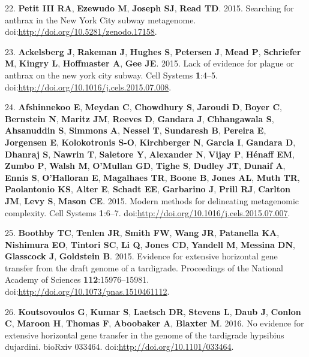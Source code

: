 \documentclass[11pt,]{article}
\begin{document}
22. \textbf{Petit III RA}, \textbf{Ezewudo M}, \textbf{Joseph SJ},
\textbf{Read TD}. 2015. Searching for anthrax in the New York City
subway metagenome. doi:\url{http://doi.org/10.5281/zenodo.17158}.

23. \textbf{Ackelsberg J}, \textbf{Rakeman J}, \textbf{Hughes S},
\textbf{Petersen J}, \textbf{Mead P}, \textbf{Schriefer M},
\textbf{Kingry L}, \textbf{Hoffmaster A}, \textbf{Gee JE}. 2015. Lack of
evidence for plague or anthrax on the new york city subway. Cell Systems
\textbf{1}:4--5. doi:\url{http://doi.org/10.1016/j.cels.2015.07.008}.

24. \textbf{Afshinnekoo E}, \textbf{Meydan C}, \textbf{Chowdhury S},
\textbf{Jaroudi D}, \textbf{Boyer C}, \textbf{Bernstein N},
\textbf{Maritz JM}, \textbf{Reeves D}, \textbf{Gandara J},
\textbf{Chhangawala S}, \textbf{Ahsanuddin S}, \textbf{Simmons A},
\textbf{Nessel T}, \textbf{Sundaresh B}, \textbf{Pereira E},
\textbf{Jorgensen E}, \textbf{Kolokotronis S-O}, \textbf{Kirchberger N},
\textbf{Garcia I}, \textbf{Gandara D}, \textbf{Dhanraj S},
\textbf{Nawrin T}, \textbf{Saletore Y}, \textbf{Alexander N},
\textbf{Vijay P}, \textbf{Hénaff EM}, \textbf{Zumbo P}, \textbf{Walsh
M}, \textbf{O'Mullan GD}, \textbf{Tighe S}, \textbf{Dudley JT},
\textbf{Dunaif A}, \textbf{Ennis S}, \textbf{O'Halloran E},
\textbf{Magalhaes TR}, \textbf{Boone B}, \textbf{Jones AL}, \textbf{Muth
TR}, \textbf{Paolantonio KS}, \textbf{Alter E}, \textbf{Schadt EE},
\textbf{Garbarino J}, \textbf{Prill RJ}, \textbf{Carlton JM},
\textbf{Levy S}, \textbf{Mason CE}. 2015. Modern methods for delineating
metagenomic complexity. Cell Systems \textbf{1}:6--7.
doi:\url{http://doi.org/10.1016/j.cels.2015.07.007}.

25. \textbf{Boothby TC}, \textbf{Tenlen JR}, \textbf{Smith FW},
\textbf{Wang JR}, \textbf{Patanella KA}, \textbf{Nishimura EO},
\textbf{Tintori SC}, \textbf{Li Q}, \textbf{Jones CD}, \textbf{Yandell
M}, \textbf{Messina DN}, \textbf{Glasscock J}, \textbf{Goldstein B}.
2015. Evidence for extensive horizontal gene transfer from the draft
genome of a tardigrade. Proceedings of the National Academy of Sciences
\textbf{112}:15976--15981.
doi:\url{http://doi.org/10.1073/pnas.1510461112}.

26. \textbf{Koutsovoulos G}, \textbf{Kumar S}, \textbf{Laetsch DR},
\textbf{Stevens L}, \textbf{Daub J}, \textbf{Conlon C}, \textbf{Maroon
H}, \textbf{Thomas F}, \textbf{Aboobaker A}, \textbf{Blaxter M}. 2016.
No evidence for extensive horizontal gene transfer in the genome of the
tardigrade hypsibius dujardini. bioRxiv 033464.
doi:\url{http://doi.org/10.1101/033464}.
\end{document}
